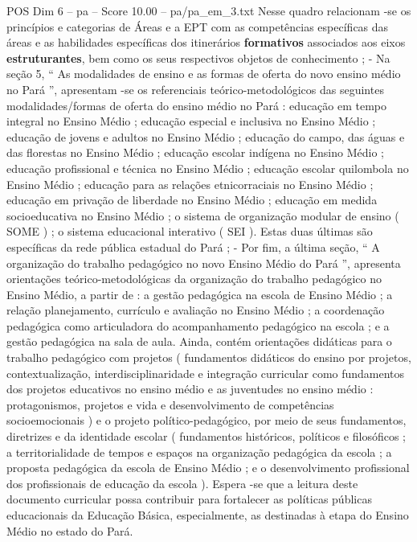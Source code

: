 \begin{textsample}{POS Dim 6 – pa – Score 10.00 – pa/pa\_em\_3.txt}
Nesse quadro relacionam -se os princípios e categorias de Áreas e a EPT com as competências específicas das áreas e as habilidades específicas dos itinerários \textbf{formativos} associados aos eixos \textbf{estruturantes}, bem como os seus respectivos objetos de conhecimento ; - Na seção 5, “ As modalidades de ensino e as formas de oferta do novo ensino médio no Pará ”, apresentam -se os referenciais teórico-metodológicos das seguintes modalidades/formas de oferta do ensino médio no Pará : educação em tempo integral no Ensino Médio ; educação especial e inclusiva no Ensino Médio ; educação de jovens e adultos no Ensino Médio ; educação do campo, das águas e das florestas no Ensino Médio ; educação escolar indígena no Ensino Médio ; educação profissional e técnica no Ensino Médio ; educação escolar quilombola no Ensino Médio ; educação para as relações etnicorraciais no Ensino Médio ; educação em privação de liberdade no Ensino Médio ; educação em medida socioeducativa no Ensino Médio ; o sistema de organização modular de ensino ( SOME ) ; o sistema educacional interativo ( SEI ).
Estas duas últimas são específicas da rede pública estadual do Pará ; - Por fim, a última seção, “ A organização do trabalho pedagógico no novo Ensino Médio do Pará ”, apresenta orientações teórico-metodológicas da organização do trabalho pedagógico no Ensino Médio, a partir de : a gestão pedagógica na escola de Ensino Médio ; a relação planejamento, currículo e avaliação no Ensino Médio ; a coordenação pedagógica como articuladora do acompanhamento pedagógico na escola ; e a gestão pedagógica na sala de aula.
Ainda, contém orientações didáticas para o trabalho pedagógico com projetos ( fundamentos didáticos do ensino por projetos, contextualização, interdisciplinaridade e integração curricular como fundamentos dos projetos educativos no ensino médio e as juventudes no ensino médio : protagonismos, projetos e vida e desenvolvimento de competências socioemocionais ) e o projeto político-pedagógico, por meio de seus fundamentos, diretrizes e da identidade escolar ( fundamentos históricos, políticos e filosóficos ; a territorialidade de tempos e espaços na organização pedagógica da escola ; a proposta pedagógica da escola de Ensino Médio ; e o desenvolvimento profissional dos profissionais de educação da escola ).
Espera -se que a leitura deste documento curricular possa contribuir para fortalecer as políticas públicas educacionais da Educação Básica, especialmente, as destinadas à etapa do Ensino Médio no estado do Pará.

\end{textsample}
